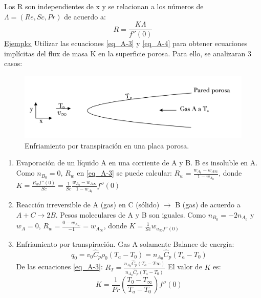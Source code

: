 Los R son independientes de x y se relacionan a los números de $\Lambda=(Re,Sc,Pr)$ de acuerdo a:
\begin{equation*}
R=\frac{K\Lambda}{f''(0)} \tag{A-4} \label{eq_A-4}
\end{equation*}
\underline{Ejemplo:} Utilizar las ecuaciones \eqref{eq_A-3} y \eqref{eq_A-4} para obtener ecuaciones implícitas del flux de masa K en la superficie porosa. Para ello, se analizaran 3 casos:

\begin{figure}[h]

        \includegraphics[width=\linewidth]{Capitulo3/Imagenes/Fig_A.1.png}
    \caption{Enfriamiento por transpiración en una placa porosa.}
        \label{fig:Fig_A.1}

\end{figure}

\begin{enumerate}
    \item Evaporación de un líquido A en una corriente de A y B. B es insoluble en A. \newline
    Como $n_{B_0}=0$, $R_w$ en \eqref{eq_A-3} se puede calcular: $R_w=\frac{w_{A_0}-w_{A\infty}}{1-w_{A_0}}$, donde $K=\frac{R_w f''(0)}{Sc}=\frac{1}{Sc}\frac{w_{A_0}-w_{A\infty}}{1-w_{A_0}}f''(0)$
    \item Reacción irreversible de A (gas) en C (sólido) $\to$ B (gas) de acuerdo a $A+C\to 2B$. Pesos moleculares de A y B son iguales. Como $n_{B_0}=-2n_{A_0}$ y $w_A=0$, $R_w=\frac{0-w_{A_\infty}}{-1}=w_{A_\infty}$, donde $K=\frac{1}{Sc}w_{a_\infty f''(0)}$
    \item Enfriamiento por transpiración. Gas A solamente
    \newline 
    Balance de energía:
    \begin{equation*}
        q_0=v_0\hat{C}_p\rho_0(T_a-T_0 )=n_{A_0}\hat{C}_p(T_a-T_0)
    \end{equation*}
    De las ecuaciones \eqref{eq_A-3}: $R_T=\frac{n_{A_0}\hat{C}_p(T_o-T\infty)}{n_{A_0}\hat{C}_p(T_a-T_0)}$
    \newline
    El valor de \( K \) es: \[ K = \frac{1}{Pr} \left( \frac{T_0 - T_\infty}{T_a - T_0} \right) f''(0) \]
\end{enumerate}
